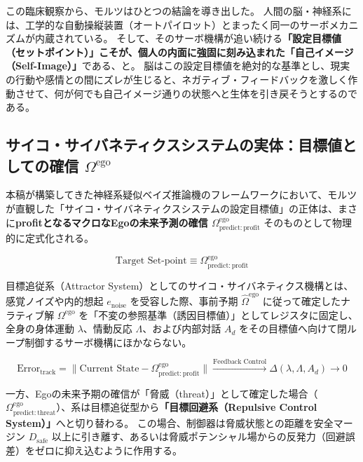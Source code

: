 この臨床観察から、モルツはひとつの結論を導き出した。
人間の脳・神経系には、工学的な自動操縦装置（オートパイロット）とまったく同一のサーボメカニズムが内蔵されている。
そして、そのサーボ機構が追い続ける\textbf{「設定目標値（セットポイント）」こそが、個人の内面に強固に刻み込まれた「自己イメージ（Self-Image）」}である、と。
脳はこの設定目標値を絶対的な基準とし、現実の行動や感情との間にズレが生じると、ネガティブ・フィードバックを激しく作動させて、何が何でも自己イメージ通りの状態へと生体を引き戻そうとするのである。

\subsection{サイコ・サイバネティクスシステムの実体：目標値としての確信 $\Omega^{\mathrm{ego}}$}

本稿が構築してきた神経系疑似ベイズ推論機のフレームワークにおいて、モルツが直観した「サイコ・サイバネティクスシステムの設定目標値」の正体は、まさに\textbf{profitとなるマクロなEgoの未来予測の確信 $\Omega^{\mathrm{ego}}_{\mathrm{predict:profit}}$} そのものとして物理的に定式化される。

\begin{equation}
    \text{Target Set-point} \equiv \Omega^{\mathrm{ego}}_{\mathrm{predict:profit}}
\end{equation}

目標追従系（Attractor System）としてのサイコ・サイバネティクス機構とは、感覚ノイズや内的想起 $e_{\mathrm{noise}}$ を受容した際、事前予期 $\hat{\Omega}^{\mathrm{ego}}$ に従って確定したナラティブ解 $\Omega^{\mathrm{ego}}$ を「不変の参照基準（誘因目標値）」としてレジスタに固定し、全身の身体運動 $\lambda$、情動反応 $\Lambda$、および内部対話 $A_d$ をその目標値へ向けて閉ループ制御するサーボ機構にほかならない。

\begin{equation}
    \text{Error}_{\mathrm{track}} = \| \text{Current State} - \Omega^{\mathrm{ego}}_{\mathrm{predict:profit}} \| \xrightarrow{\text{Feedback Control}} \Delta (\lambda, \Lambda, A_d) \longrightarrow 0
\end{equation}

一方、Egoの未来予期の確信が「脅威（threat）」として確定した場合（$\Omega^{\mathrm{ego}}_{\mathrm{predict:threat}}$）、系は目標追従型から\textbf{「目標回避系（Repulsive Control System）」}へと切り替わる。
この場合、制御器は脅威状態との距離を安全マージン $D_{\mathrm{safe}}$ 以上に引き離す、あるいは脅威ポテンシャル場からの反発力（回避誤差）をゼロに抑え込むように作用する。

